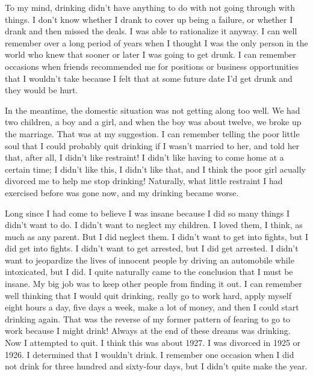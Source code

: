 \begin{biblechapter}
\verse To my mind, 
    drinking didn’t have anything to do with not going through with things.
\verse I don’t know whether I drank to cover up being a failure, 
    or whether I drank and then missed the deals.
\verse I was able to rationalize it anyway.
\verse I can well remember over a long period of years 
    when I thought I was the only person in the world 
    who knew that sooner or later I was going to get drunk.
\verse I can remember occasions when friends recommended me for positions 
    or business opportunities that I wouldn’t take 
    because I felt that at some future date 
    I’d get drunk and they would be hurt.

\verse In the meantime, 
    the domestic situation was not getting along too well.
\verse We had two children, a boy and a girl, 
    and when the boy was about twelve, 
    we broke up the marriage.
\verse That was at my suggestion.
\verse I can remember telling the poor little soul 
    that I could probably quit drinking if I wasn’t married to her, 
    and told her that, after all, 
    I didn’t like restraint!
\verse I didn’t like having to come home at a certain time; 
    I didn’t like this, I didn’t like that, 
    and I think the poor girl acually divorced me to help me stop drinking!
\verse Naturally, what little restraint I had exercised before 
    was gone now, 
    and my drinking became worse.

\verse Long since I had come to believe I was insane 
    because I did so many things I didn’t want to do.
\verse I didn’t want to neglect my children.
\verse I loved them, I think, as much as any parent.
\verse But I did neglect them.
\verse I didn’t want to get into fights, but I did get into fights.
\verse I didn’t want to get arrested, but I did get arrested.
\verse I didn’t want to jeopardize the lives of innocent people 
    by driving an automobile while intoxicated, but I did.
\verse I quite naturally came to the conclusion that I must be insane.
\verse My big job was to keep other people from finding it out.
\verse I can remember well thinking that I would quit drinking, 
    really go to work hard, 
    apply myself eight hours a day, 
    five days a week, 
    make a lot of money, 
    and then I could start drinking again.
\verse That was the reverse of my former pattern of fearing to go to work 
    because I might drink!
\verse Always at the end of these dreams was drinking.
\verse Now I attempted to quit.
\verse I think this was about 1927.
\verse I was divorced in 1925 or 1926.
\verse I determined that I wouldn’t drink.
\verse I remember one occasion when I did not drink 
    for three hundred and sixty-four days, 
    but I didn’t quite make the year.
\end{biblechapter}


